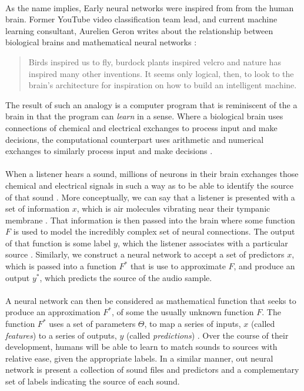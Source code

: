 \documentclass[12pt,letterpaper]{article}
\begin{document}
\paragraph*{}As the name implies, Early neural networks were inspired from from the human brain. Former YouTube video classification team lead, and current machine learning consultant, Aurelien Geron writes about the relationship between biological brains and mathematical neural networks \cite{Geron}: 
\begin{quote}
Birds inspired us to fly, burdock plants inspired velcro and nature has inspired many other inventions. It seems only logical, then, to look to the brain's architecture for inspiration on how to build an intelligent machine.
\end{quote}
The result of such an analogy is a computer program that is reminiscent of the a brain in that the program can \textit{learn} in a sense. Where a biological brain uses connections of chemical and electrical exchanges to process input and make decisions, the computational counterpart uses arithmetic and numerical exchanges to similarly process input and make decisions \cite{Geron,Levine}. 

\paragraph*{}When a listener hears a sound, millions of neurons in their brain exchanges those chemical and electrical signals in such a way as to be able to identify the source of that sound \cite{Geron,Virtanen}. More conceptually, we can say that a listener is presented with a set of information $x$, which is air molecules vibrating near their tympanic membrane \cite{White}. That information is then passed into the brain where some function $F$ is used to model the incredibly complex set of neural connections. The output of that function is some label $y$, which the listener associates with a particular source \cite{Olson}. Similarly, we construct a neural network to accept a set of predictors $x$, which is passed into a function $F^*$ that is use to approximate $F$, and produce an output $y^*$, which predicts the source of the audio sample.

\paragraph*{}A neural network can then be considered as mathematical function that seeks to produce an approximation $F^*$, of some the usually unknown function $F$. The function $F^*$ uses a set of parameters $\Theta$, to map a series of inputs, $x$ (called \textit{features}) to a series of outputs, $y$ (called \textit{predictions}) \cite{Goodfellow,James,Virtanen}. Over the course of their development, humans will be able to learn to match sounds to sources with relative ease, given the appropriate labels. In a similar manner, out neural network is present a collection of sound files and predictors and a complementary set of labels indicating the source of each sound.
\end{document}
